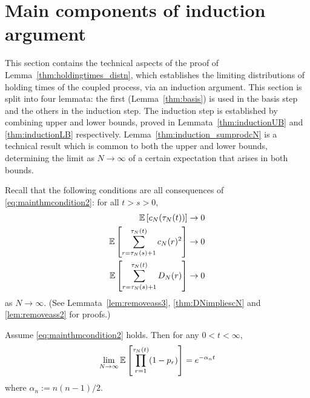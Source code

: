 \section{Main components of induction argument}
This section contains the technical aspects of the proof of Lemma~\ref{thm:holdingtimes_distn}, which establishes the limiting distributions of holding times of the coupled process, via an induction argument.
This section is split into four lemmata: the first (Lemma~\ref{thm:basis}) is used in the basis step and the others in the induction step. The induction step is established by combining upper and lower bounds, proved in Lemmata~\ref{thm:inductionUB} and \ref{thm:inductionLB} respectively. Lemma~\ref{thm:induction_sumprodcN} is a technical result which is common to both the upper and lower bounds, determining the limit as $N\to\infty$ of a certain expectation that arises in both bounds.

Recall that the following conditions are all consequences of \eqref{eq:mainthmcondition2}: for all $t>s>0$,
\begin{align}
\mathbb{E} \left[ c_N(\tau_N(t)) \right] &\rightarrow 0 \label{eq:BJJK_eq3.3}\\
\mathbb{E}\left[ \sum_{r=\tau_N(s)+1}^{\tau_N(t)} c_N(r)^2 \right] &\rightarrow 0
        \label{eq:BJJK_eq3.5}\\
\mathbb{E}\left[ \sum_{r=\tau_N(s)+1}^{\tau_N(t)} D_N(r) \right] &\rightarrow 0
        \label{eq:BJJK_eq3.4}
\end{align}
as $N\to\infty$. (See Lemmata~\ref{lem:removeass3}, \ref{thm:DNimpliescN} and \ref{lem:removeass2} for proofs.)



\begin{lemma}\label{thm:basis}
Assume \eqref{eq:mainthmcondition2} holds.
Then for any $0 < t < \infty$,
\begin{equation*}
\lim_{N\to\infty} \mathbb{E}\left[ \prod_{r=1}^{\tau_N(t)} (1-p_r) \right] 
= e^{-\alpha_n t}
\end{equation*}
where $\alpha_n := n(n-1)/2$.
\end{lemma}


